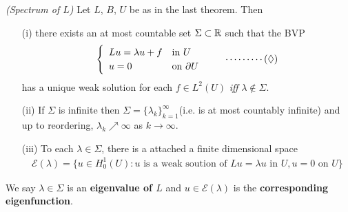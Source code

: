 \documentclass[12pt,a4paper]{report}
\begin{document}
\thm \emph{(Spectrum of $L$)} Let $L$, $B$, $U$ be as in the last theorem. Then
\begin{itemize}
\item[(i)] there exists an at most countable set $\Sigma \subset \mathbb{R}$ such that the BVP
\begin{align*}
\begin{cases}
\begin{array}{ll}
Lu = \lambda u + f & \text{in } U \\
u = 0 & \text{on } \partial U
\end{array}
\end{cases} \quad \cdots \cdots \cdots (\lozenge)
\end{align*}
has a unique weak solution for each $f\in L^2(U)$ \emph{iff} $\lambda \not\in \Sigma$.
\item[(ii)] If $\Sigma$ is infinite then $\Sigma = \{\lambda_k \}_{k=1}^{\infty}$(i.e. is at most countably infinite) and up to reordering, $\lambda_k \nearrow \infty$ as $k\rightarrow \infty$.
\item[(iii)] To each $\lambda \in \Sigma$, there is a attached a finite dimensional space
\begin{align*}
\mathscr{E}(\lambda) = \{ u \in H_0^1(U) : u \text{ is a weak soution of } Lu=\lambda u \text{ in } U, u=0 \text{ on } U \}
\end{align*}
\end{itemize}
We say $\lambda \in \Sigma$ is an \textbf{eigenvalue of $L$} and $u\in \mathscr{E}(\lambda)$ is the \textbf{corresponding eigenfunction}.
\end{document}
